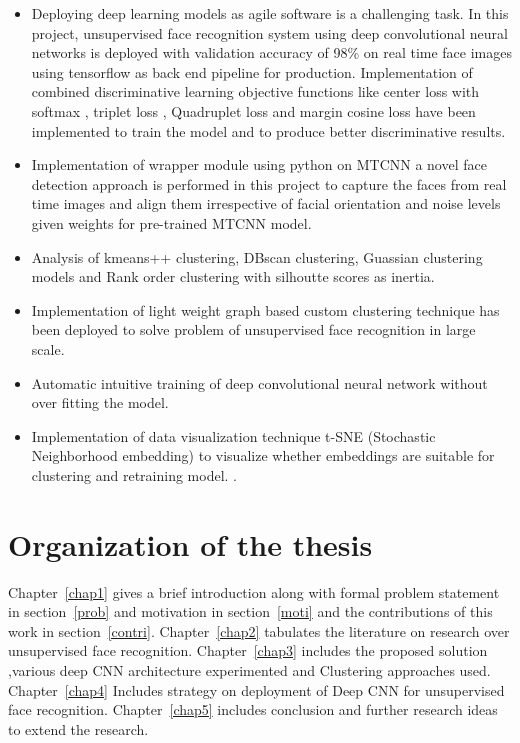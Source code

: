 \documentclass[a4paper,12pt, twoside]{NITKReport}
\begin{document}
\begin{itemize}
\item Deploying deep learning models as agile software is a challenging task. In this project, unsupervised face recognition system using deep convolutional neural networks is deployed with validation accuracy of 98\% on real time face images using tensorflow as back end pipeline for production. Implementation of combined discriminative learning objective functions like center loss with softmax \cite{wen2016discriminative}, triplet loss \cite{schroff2015facenet}, Quadruplet loss \cite{chen2017beyond} and margin cosine loss\cite{DBLP:journals/corr/abs-1801-09414} have been implemented to train the model and to produce better discriminative results.
\item Implementation of wrapper module using python on MTCNN a novel face detection approach is performed in this project to capture the faces from real time images and align them irrespective of facial orientation and noise levels given weights for pre-trained MTCNN model. \cite{xiang2017joint}
\item Analysis of kmeans++ clustering, DBscan clustering, Guassian clustering models and Rank order clustering with silhoutte scores as inertia.
\item Implementation of light weight graph based custom clustering technique has been deployed to solve problem of unsupervised face recognition in large scale. 
\item Automatic intuitive training of deep convolutional neural network without over fitting the model. \cite{DBLP:journals/corr/CogswellAGZB15} 
\item Implementation of data visualization technique t-SNE (Stochastic Neighborhood embedding) to visualize whether embeddings are suitable for clustering and retraining model. \cite{maaten2008visualizing}. 

\end{itemize}
	
\section{Organization of the thesis}
	Chapter~\ref{chap1} gives a brief introduction along with formal problem statement in section~\ref{prob} and motivation in section~\ref{moti} and the contributions of this work in section~\ref{contri}. Chapter~\ref{chap2} tabulates the literature on research over unsupervised face recognition. Chapter~\ref{chap3} includes the proposed solution ,various deep CNN architecture experimented and Clustering approaches used. Chapter~\ref{chap4} Includes strategy on deployment of Deep CNN for unsupervised face recognition. Chapter~\ref{chap5} includes conclusion and further research ideas to extend the research.  
	
\end{document}
